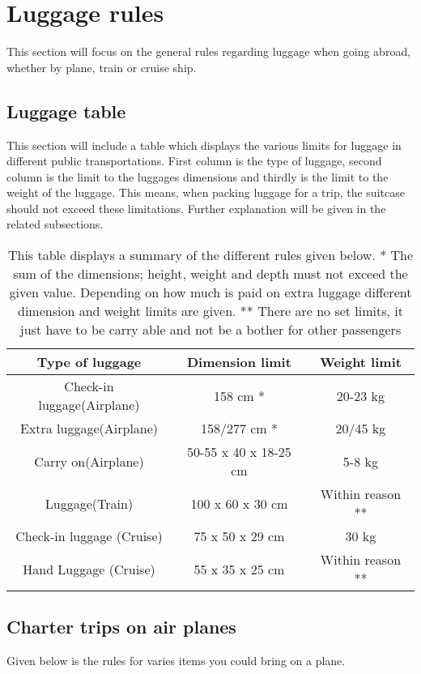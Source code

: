 \section{Luggage rules}
This section will focus on the general rules regarding luggage when going abroad, whether by plane, train or cruise ship.
\subsection{Luggage table}
This section will include a table which displays the various limits for luggage in different public transportations. First column is the type of luggage, second column is the limit to the luggages dimensions and thirdly is the limit to the weight of the luggage. This means, when packing luggage for a trip, the suitcase should not exceed these limitations. Further explanation will be given in the related subsections.
\begin{table}[H]
\begin{tabular}{| c | c | c |}
\hline
Type of luggage &  Dimension limit & Weight limit \\ \hline
Check-in luggage(Airplane) & 158 cm * & 20-23 kg \\ \hline
Extra luggage(Airplane) & 158/277 cm * &  20/45 kg \\ \hline
Carry on(Airplane) & 50-55 x 40 x 18-25 cm & 5-8 kg \\ \hline
Luggage(Train) & 100 x 60 x 30 cm & Within reason **\\ \hline
Check-in luggage (Cruise) & 75 x 50 x 29 cm & 30 kg \\ \hline
Hand Luggage (Cruise) & 55 x 35 x 25 cm & Within reason **\\ \hline
\end{tabular}
\caption{This table displays a summary of the different rules given below.\newline
* The sum of the dimensions; height, weight and depth must not exceed the given value. 
Depending on how much is paid on extra luggage different dimension and weight limits are given.\newline
** There are no set limits, it just have to be carry able and not be a bother for other passengers}
\end{table}

\subsection{Charter trips on air planes}
Given below is the rules for varies items you could bring on a plane.

